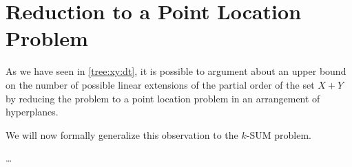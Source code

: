 \section{Reduction to a Point Location Problem}

As we have seen in \ref{tree:xy:dt}, it is possible to argument about an upper
bound on the number of possible linear extensions of the partial order of the
set $X + Y$ by reducing the problem to a point location problem in an
arrangement of hyperplanes.

We will now formally generalize this observation to the $k$-SUM problem.

\dots
